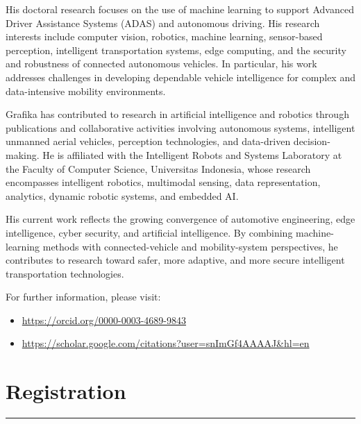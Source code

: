 \documentclass[10pt,a4paper]{article}
\begin{document}
\vspace{1em}

His doctoral research focuses on the use of machine learning to support Advanced Driver Assistance Systems (ADAS) and autonomous driving. His research interests include computer vision, robotics, machine learning, sensor-based perception, intelligent transportation systems, edge computing, and the security and robustness of connected autonomous vehicles. In particular, his work addresses challenges in developing dependable vehicle intelligence for complex and data-intensive mobility environments.

\vspace{1em}

Grafika has contributed to research in artificial intelligence and robotics through publications and collaborative activities involving autonomous systems, intelligent unmanned aerial vehicles, perception technologies, and data-driven decision-making. He is affiliated with the Intelligent Robots and Systems Laboratory at the Faculty of Computer Science, Universitas Indonesia, whose research encompasses intelligent robotics, multimodal sensing, data representation, analytics, dynamic robotic systems, and embedded AI.

\vspace{1em}

His current work reflects the growing convergence of automotive engineering, edge intelligence, cyber security, and artificial intelligence. By combining machine-learning methods with connected-vehicle and mobility-system perspectives, he contributes to research toward safer, more adaptive, and more secure intelligent transportation technologies.

\vspace{1em}

For further information, please visit:
\begin{itemize}
    \setlength{\itemsep}{0pt}
    \item \url{https://orcid.org/0000-0003-4689-9843}
    \item \url{https://scholar.google.com/citations?user=snImGf4AAAAJ\&hl=en}
\end{itemize}

\clearpage
\section{\textbf{Registration}}
\color{conf}\rule{\linewidth}{1pt}\color{black}
\vspace{0.8em}
\end{document}

